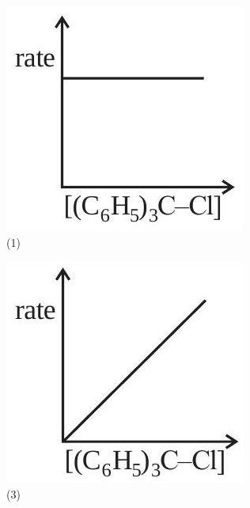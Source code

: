\documentclass[10pt]{article}
\begin{document}
\begin{figure}[h]
\begin{center}
\captionsetup{labelformat=empty}
\caption{(1)}
  \includegraphics[width=\textwidth]{2025_10_02_a54bf82dc4585184bb5fg-1(3)}
\end{center}
\end{figure}

\begin{figure}[h]
\begin{center}
\captionsetup{labelformat=empty}
\caption{(3)}
  \includegraphics[width=\textwidth]{2025_10_02_a54bf82dc4585184bb5fg-1(7)}
\end{center}
\end{figure}
\end{document}
